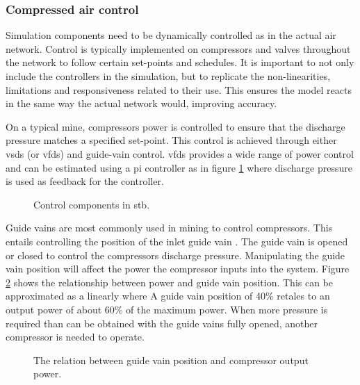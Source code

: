 		\subsubsection{Compressed air control}\label{Controllers}
			Simulation components need to be dynamically controlled as in the actual air network. Control is typically implemented on compressors and valves throughout the network to follow certain set-points and schedules. It is important to not only include the controllers in the simulation, but to replicate the non-linearities, limitations and responsiveness related to their use. This ensures the model reacts in the same way the actual network would, improving accuracy.
			\par 
			On a typical mine, compressors power is controlled to ensure that the discharge pressure matches a specified set-point. This control is achieved through either \glspl{vsd} (or \glspl{vfd}) and guide-vain control. \glspl{vfd} provides a wide range of power control and can be estimated using a \gls{pi} controller as in figure \ref{fig: Controller models} where discharge pressure is used as feedback for the controller. 
	\begin{figure}[h]
		\centering
		\caption{Control components in \gls{stb}.}
		\label{fig: Controller models}
	\end{figure}
		Guide vains are most commonly used in mining to control compressors. This entails controlling the position of the inlet guide vain . The guide vain is opened or closed to control the compressors discharge pressure.  Manipulating the guide vain position will affect the power the compressor inputs into the system. Figure \ref{fig: Guide vain position} shows the relationship between  power and guide vain position. This can be approximated as a linearly where A guide vain position of 40\%  retales to an output power of about 60\% of the maximum power. When more pressure is required than can be obtained with the guide vains fully opened, another compressor is needed to operate. 
		\begin{figure}[h]
			\centering
			\fbox{}
			\caption[The relation between guide vain position and compressor output power.]{The relation between guide vain position and compressor output power.}
			\label{fig: Guide vain position}
		\end{figure}

